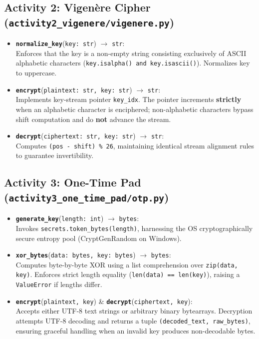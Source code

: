 \documentclass[12pt,a4paper]{report}
\begin{document}
\subsection{Activity 2: Vigen\`ere Cipher (\texttt{activity2\_vigenere/vigenere.py})}
\begin{itemize}[leftmargin=1.5em]
    \item \textbf{\texttt{normalize\_key}}(\texttt{key: str}) $\to$ \texttt{str}:\\[2pt]
    Enforces that the key is a non-empty string consisting exclusively of ASCII alphabetic characters (\texttt{key.isalpha() and key.isascii()}). Normalizes key to uppercase.
    \item \textbf{\texttt{encrypt}}(\texttt{plaintext: str, key: str}) $\to$ \texttt{str}:\\[2pt]
    Implements key-stream pointer \texttt{key\_idx}. The pointer increments \textbf{strictly} when an alphabetic character is enciphered; non-alphabetic characters bypass shift computation and do \textbf{not} advance the stream.
    \item \textbf{\texttt{decrypt}}(\texttt{ciphertext: str, key: str}) $\to$ \texttt{str}:\\[2pt]
    Computes \texttt{(pos - shift) \% 26}, maintaining identical stream alignment rules to guarantee invertibility.
\end{itemize}

\subsection{Activity 3: One-Time Pad (\texttt{activity3\_one\_time\_pad/otp.py})}
\begin{itemize}[leftmargin=1.5em]
    \item \textbf{\texttt{generate\_key}}(\texttt{length: int}) $\to$ \texttt{bytes}:\\[2pt]
    Invokes \texttt{secrets.token\_bytes(length)}, harnessing the OS cryptographically secure entropy pool (CryptGenRandom on Windows).
    \item \textbf{\texttt{xor\_bytes}}(\texttt{data: bytes, key: bytes}) $\to$ \texttt{bytes}:\\[2pt]
    Computes byte-by-byte XOR using a list comprehension over \texttt{zip(data, key)}. Enforces strict length equality (\texttt{len(data) == len(key)}), raising a \texttt{ValueError} if lengths differ.
    \item \textbf{\texttt{encrypt}}(\texttt{plaintext, key}) \& \textbf{\texttt{decrypt}}(\texttt{ciphertext, key}):\\[2pt]
    Accepts either UTF-8 text strings or arbitrary binary bytearrays. Decryption attempts UTF-8 decoding and returns a tuple \texttt{(decoded\_text, raw\_bytes)}, ensuring graceful handling when an invalid key produces non-decodable bytes.
\end{itemize}
\end{document}
